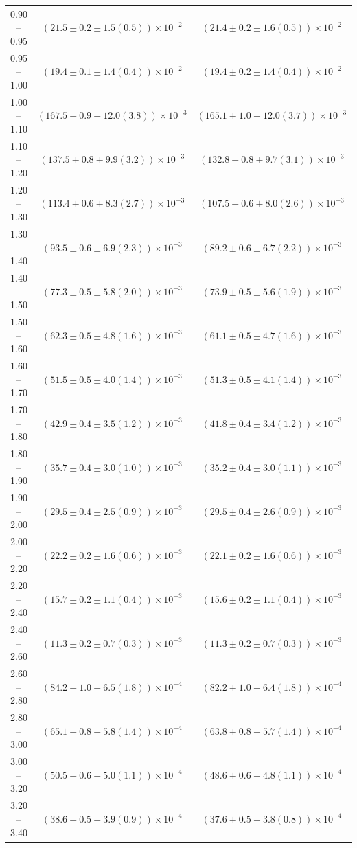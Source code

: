 \begin{table}
\begin{center}
\begin{tabular}{ c | c c }
0.90 -- 0.95 & $(21.5\pm0.2\pm1.5(0.5))\times10^{-2}$ & $(21.4\pm0.2\pm1.6(0.5))\times10^{-2}$ \\ 
0.95 -- 1.00 & $(19.4\pm0.1\pm1.4(0.4))\times10^{-2}$ & $(19.4\pm0.2\pm1.4(0.4))\times10^{-2}$ \\ 
1.00 -- 1.10 & $(167.5\pm0.9\pm12.0(3.8))\times10^{-3}$ & $(165.1\pm1.0\pm12.0(3.7))\times10^{-3}$ \\ 
1.10 -- 1.20 & $(137.5\pm0.8\pm9.9(3.2))\times10^{-3}$ & $(132.8\pm0.8\pm9.7(3.1))\times10^{-3}$ \\ 
1.20 -- 1.30 & $(113.4\pm0.6\pm8.3(2.7))\times10^{-3}$ & $(107.5\pm0.6\pm8.0(2.6))\times10^{-3}$ \\ 
1.30 -- 1.40 & $(93.5\pm0.6\pm6.9(2.3))\times10^{-3}$ & $(89.2\pm0.6\pm6.7(2.2))\times10^{-3}$ \\ 
1.40 -- 1.50 & $(77.3\pm0.5\pm5.8(2.0))\times10^{-3}$ & $(73.9\pm0.5\pm5.6(1.9))\times10^{-3}$ \\ 
1.50 -- 1.60 & $(62.3\pm0.5\pm4.8(1.6))\times10^{-3}$ & $(61.1\pm0.5\pm4.7(1.6))\times10^{-3}$ \\ 
1.60 -- 1.70 & $(51.5\pm0.5\pm4.0(1.4))\times10^{-3}$ & $(51.3\pm0.5\pm4.1(1.4))\times10^{-3}$ \\ 
1.70 -- 1.80 & $(42.9\pm0.4\pm3.5(1.2))\times10^{-3}$ & $(41.8\pm0.4\pm3.4(1.2))\times10^{-3}$ \\ 
1.80 -- 1.90 & $(35.7\pm0.4\pm3.0(1.0))\times10^{-3}$ & $(35.2\pm0.4\pm3.0(1.1))\times10^{-3}$ \\ 
1.90 -- 2.00 & $(29.5\pm0.4\pm2.5(0.9))\times10^{-3}$ & $(29.5\pm0.4\pm2.6(0.9))\times10^{-3}$ \\ 
2.00 -- 2.20 & $(22.2\pm0.2\pm1.6(0.6))\times10^{-3}$ & $(22.1\pm0.2\pm1.6(0.6))\times10^{-3}$ \\ 
2.20 -- 2.40 & $(15.7\pm0.2\pm1.1(0.4))\times10^{-3}$ & $(15.6\pm0.2\pm1.1(0.4))\times10^{-3}$ \\ 
2.40 -- 2.60 & $(11.3\pm0.2\pm0.7(0.3))\times10^{-3}$ & $(11.3\pm0.2\pm0.7(0.3))\times10^{-3}$ \\ 
2.60 -- 2.80 & $(84.2\pm1.0\pm6.5(1.8))\times10^{-4}$ & $(82.2\pm1.0\pm6.4(1.8))\times10^{-4}$ \\ 
2.80 -- 3.00 & $(65.1\pm0.8\pm5.8(1.4))\times10^{-4}$ & $(63.8\pm0.8\pm5.7(1.4))\times10^{-4}$ \\ 
3.00 -- 3.20 & $(50.5\pm0.6\pm5.0(1.1))\times10^{-4}$ & $(48.6\pm0.6\pm4.8(1.1))\times10^{-4}$ \\ 
3.20 -- 3.40 & $(38.6\pm0.5\pm3.9(0.9))\times10^{-4}$ & $(37.6\pm0.5\pm3.8(0.8))\times10^{-4}$ \\ 

\end{tabular}
\end{center}
\end{table}
